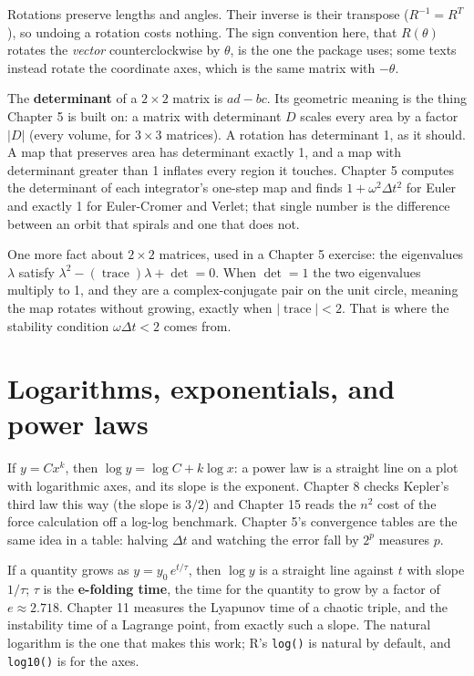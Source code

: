 \documentclass[
  10.5pt,
  letterpaper,
]{scrbook}
\theoremstyle{plain}
\theoremstyle{remark}
\begin{document}
Rotations preserve lengths and angles. Their inverse is their transpose
(\(R^{-1} = R^{T}\)), so undoing a rotation costs nothing. The sign
convention here, that \(R(\theta)\) rotates the \emph{vector}
counterclockwise by \(\theta\), is the one the package uses; some texts
instead rotate the coordinate axes, which is the same matrix with
\(-\theta\).

The \textbf{determinant} of a \(2\times2\) matrix is \(ad - bc\). Its
geometric meaning is the thing Chapter 5 is built on: a matrix with
determinant \(D\) scales every area by a factor \(|D|\) (every volume,
for \(3\times3\) matrices). A rotation has determinant 1, as it should.
A map that preserves area has determinant exactly 1, and a map with
determinant greater than 1 inflates every region it touches. Chapter 5
computes the determinant of each integrator's one-step map and finds
\(1 + \omega^2\Delta t^2\) for Euler and exactly 1 for Euler-Cromer and
Verlet; that single number is the difference between an orbit that
spirals and one that does not.

One more fact about \(2\times2\) matrices, used in a Chapter 5 exercise:
the eigenvalues \(\lambda\) satisfy
\(\lambda^2 - (\operatorname{trace})\lambda + \det = 0\). When
\(\det = 1\) the two eigenvalues multiply to 1, and they are a
complex-conjugate pair on the unit circle, meaning the map rotates
without growing, exactly when \(|\operatorname{trace}| < 2\). That is
where the stability condition \(\omega\Delta t < 2\) comes from.

\section{Logarithms, exponentials, and power
laws}\label{logarithms-exponentials-and-power-laws}

If \(y = C x^k\), then \(\log y = \log C + k\log x\): a power law is a
straight line on a plot with logarithmic axes, and its slope is the
exponent. Chapter 8 checks Kepler's third law this way (the slope is
\(3/2\)) and Chapter 15 reads the \(n^2\) cost of the force calculation
off a log-log benchmark. Chapter 5's convergence tables are the same
idea in a table: halving \(\Delta t\) and watching the error fall by
\(2^p\) measures \(p\).

If a quantity grows as \(y = y_0\,e^{t/\tau}\), then \(\log y\) is a
straight line against \(t\) with slope \(1/\tau\); \(\tau\) is the
\textbf{e-folding time}, the time for the quantity to grow by a factor
of \(e \approx 2.718\). Chapter 11 measures the Lyapunov time of a
chaotic triple, and the instability time of a Lagrange point, from
exactly such a slope. The natural logarithm is the one that makes this
work; R's \texttt{log()} is natural by default, and \texttt{log10()} is
for the axes.
\end{document}
